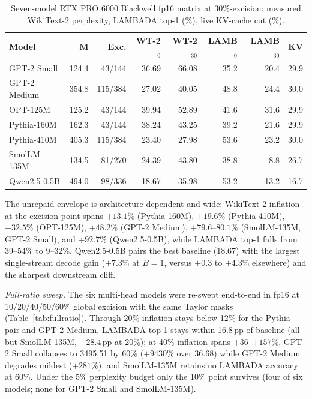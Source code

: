 \documentclass[11pt]{article}
\begin{document}
\begin{table}[!t]
\caption{Seven-model RTX PRO 6000 Blackwell fp16 matrix at 30\%-excision:
measured WikiText-2 perplexity, LAMBADA top-1 (\%), live KV-cache cut (\%).}
\label{tab:gpumatrix}
\centering
\scriptsize
\setlength{\tabcolsep}{1.6pt}
\begin{tabular}{lrrrrrrr}
\toprule
Model & M & Exc. & WT-2$_{0}$ & WT-2$_{30}$ & LAMB$_{0}$ & LAMB$_{30}$ & KV \\
\midrule
GPT-2 Small & 124.4 & 43/144 & 36.69 & 66.08 & 35.2 & 20.4 & 29.9 \\
GPT-2 Medium & 354.8 & 115/384 & 27.02 & 40.05 & 48.8 & 24.4 & 30.0 \\
OPT-125M & 125.2 & 43/144 & 39.94 & 52.89 & 41.6 & 31.6 & 29.9 \\
Pythia-160M & 162.3 & 43/144 & 38.24 & 43.25 & 39.2 & 21.6 & 29.9 \\
Pythia-410M & 405.3 & 115/384 & 23.40 & 27.98 & 53.6 & 23.2 & 30.0 \\
SmolLM-135M & 134.5 & 81/270 & 24.39 & 43.80 & 38.8 & 8.8 & 26.7 \\
Qwen2.5-0.5B & 494.0 & 98/336 & 18.67 & 35.98 & 53.2 & 13.2 & 16.7 \\
\bottomrule
\end{tabular}
\end{table}

The unrepaid envelope is architecture-dependent and wide: WikiText-2 inflation
at the excision point spans $+13.1\%$ (Pythia-160M), $+19.6\%$ (Pythia-410M),
$+32.5\%$ (OPT-125M), $+48.2\%$ (GPT-2 Medium), $+79.6$--$80.1\%$ (SmolLM-135M,
GPT-2 Small), and $+92.7\%$ (Qwen2.5-0.5B), while LAMBADA top-1 falls from
39--54\% to 9--32\%. Qwen2.5-0.5B pairs the best baseline (18.67) with the
largest single-stream decode gain ($+7.3\%$ at $B{=}1$, versus $+0.3$ to
$+4.3\%$ elsewhere) and the sharpest downstream cliff.

\emph{Full-ratio sweep.} The six multi-head models were re-swept end-to-end in
fp16 at 10/20/40/50/60\% global excision with the same Taylor masks
(Table~\ref{tab:fullratio}). Through 20\% inflation stays below 12\% for the
Pythia pair and GPT-2 Medium, LAMBADA top-1 stays within 16.8\,pp of baseline
(all but SmolLM-135M, $-28.4$\,pp at 20\%); at 40\% inflation spans
$+36$--$+157\%$, GPT-2 Small collapses to 3495.51 by 60\% ($+9430\%$ over
36.68) while GPT-2 Medium degrades mildest ($+281\%$), and SmolLM-135M retains
no LAMBADA accuracy at 60\%. Under the $5\%$ perplexity budget only the 10\%
point survives (four of six models; none for GPT-2 Small and SmolLM-135M).
\end{document}

